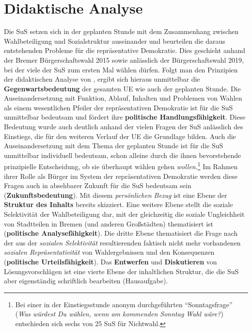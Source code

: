 \section{Didaktische Analyse}

Die SuS setzen sich in der geplanten Stunde mit dem Zusammenhang zwischen
Wahlbeteiligung und Sozialstruktur auseinander und beurteilen die daraus
entstehenden Probleme für die repräsentative Demokratie. Dies geschieht anhand
der Bremer Bürgerschaftswahl 2015 sowie anlässlich der Bürgerschaftswahl 2019,
bei der viele der SuS zum ersten Mal wählen dürfen. Folgt man den Prinzipien
der didaktischen Analyse von , ergibt sich hieraus
unmittelbar die \textbf{Gegenwartsbedeutung} der gesamten UE wie auch der
geplanten Stunde. Die Auseinandersetzung mit Funktion, Ablauf, Inhalten und
Problemen von Wahlen als einem wesentlichen Pfeiler der repräsentativen
Demokratie ist für die SuS unmittelbar bedeutsam und fördert ihre
\textbf{politische Handlungsfähigkeit}. Diese Bedeutung wurde auch deutlich
anhand der vielen Fragen der SuS anlässlich des Einstiegs, die für den weiteren
Verlauf der UE die Grundlage bilden. Auch die Auseinandersetzung mit dem Thema
der geplanten Stunde ist für die SuS unmittelbar individuell bedeutsam, schon
alleine durch die ihnen bevorstehende prinzipielle Entscheidung, ob sie
überhaupt wählen gehen \textit{wollen}.\footnote{Bei einer in der
Einstiegsstunde anonym durchgeführten \enquote{Sonntagsfrage} (\emph{Was
würdest Du wählen, wenn am kommenden Sonntag Wahl wäre?}) entschieden sich
sechs von 25 SuS für Nichtwahl.} Im Rahmen ihrer Rolle als Bürger im System der
repräsentativen Demokratie werden diese Fragen auch in absehbarer Zukunft für
die SuS bedeutsam sein (\textbf{Zukunftsbedeutung}). Mit diesem
\emph{persönlichen Bezug} ist eine Ebene der \textbf{Struktur des Inhalts}
bereits skizziert. Eine weitere Ebene stellt die soziale Selektivität der
Wahlbeteiligung dar, mit der gleichzeitig die soziale Ungleichheit von
Stadtteilen in Bremen (und anderen Großstädten) thematisiert ist
(\textbf{politische Analysefähigkeit}). Die dritte Ebene thematisiert die Frage
nach der aus der \emph{sozialen Selektivität} resultierenden faktisch nicht
mehr vorhandenen \emph{sozialen Repräsentativität} von Wahlergebnissen und den
Konsequenzen (\textbf{politische Urteilsfähigkeit}). Das \textbf{Entwerfen} und
\textbf{Diskutieren} von Lösungsvorschlägen ist eine vierte Ebene der
inhaltlichen Struktur, die die SuS aber eigenständig schriftlich bearbeiten
(Hausaufgabe).

